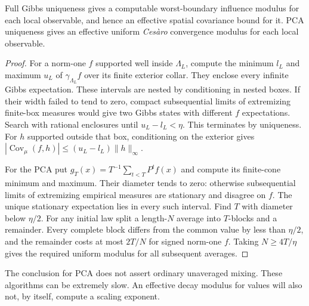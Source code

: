 \begin{proposition}
\label{prop:unique-moduli}
Full Gibbs uniqueness gives a computable worst-boundary influence
modulus for each local observable, and hence an effective spatial
covariance bound for it. PCA uniqueness gives an effective uniform
\emph{Ces\`aro} convergence modulus for each local observable.
\end{proposition}
\begin{proof}
For a norm-one $f$ supported well inside $\Lambda_L$, compute the
minimum $l_L$ and maximum $u_L$ of $\gamma_{\Lambda_L}f$ over its
finite exterior collar. They enclose every infinite Gibbs expectation.
These intervals are nested by conditioning in nested boxes. If their
width failed to tend to zero, compact subsequential limits of
extremizing finite-box measures would give two Gibbs states with
different $f$ expectations. Search with rational enclosures until
$u_L-l_L<\eta$. This terminates by uniqueness. For $h$ supported
outside that box, conditioning on the exterior gives
$|\operatorname{Cov}_\mu(f,h)|\leq(u_L-l_L)\|h\|_\infty$.

For the PCA put $g_T(x)=T^{-1}\sum_{t<T}P^tf(x)$ and compute its
finite-cone minimum and maximum. Their diameter tends to zero:
otherwise subsequential limits of extremizing empirical measures
are stationary and disagree on $f$. The unique stationary expectation
lies in every such interval. Find $T$ with diameter below $\eta/2$.
For any initial law split a length-$N$ average into $T$-blocks and a
remainder. Every complete block differs from the common value by
less than $\eta/2$, and the remainder costs at most $2T/N$ for
signed norm-one $f$. Taking $N\geq4T/\eta$ gives the required
uniform modulus for all subsequent averages.
\end{proof}
The conclusion for PCA does not assert ordinary unaveraged mixing.
These algorithms can be extremely slow. An effective decay modulus
for values will also not, by itself, compute a scaling exponent.

